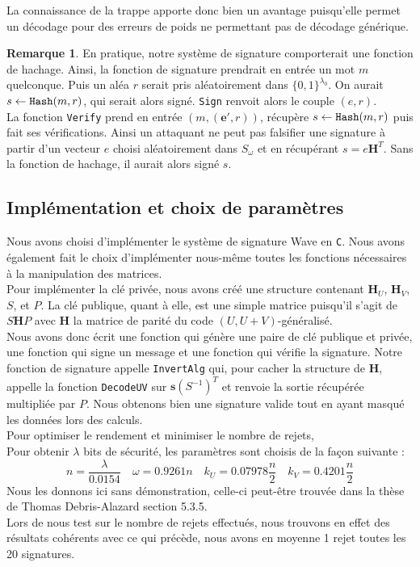 \documentclass[12pt]{article}
\theoremstyle{plain}
\theoremstyle{definition}
\newtheorem{remarque}[thm]{Remarque}
\newcommand{\e}{\mathbf{e}}
\newcommand{\s}{\mathbf{s}}
\begin{document}
\noindent La connaissance de la trappe apporte donc bien un avantage puisqu'elle permet un décodage pour des erreurs de poids ne permettant pas de décodage générique. 

\begin{remarque} En pratique, notre système de signature comporterait une fonction de hachage. Ainsi, la fonction de signature prendrait en entrée un mot $m$ quelconque. Puis un aléa $r$ serait pris aléatoirement dans $\{0,1\}^{\lambda_0}$. On aurait $s \leftarrow \verb|Hash| (m,r)$, qui serait alors signé. \verb|Sign| renvoit alors le couple $(e,r)$. \\
La fonction \verb|Verify| prend en entrée $(m,(\e',r))$, récupère $s \leftarrow \verb|Hash| (m,r)$ puis fait ses vérifications. Ainsi un attaquant ne peut pas falsifier une signature à partir d'un vecteur $e$ choisi aléatoirement dans $S_{\omega}$ et en récupérant $s = e\mathbf{H}^T$. Sans la fonction de hachage, il aurait alors signé $s$.
\end{remarque}

\subsection{Implémentation et choix de paramètres}

Nous avons choisi d'implémenter le système de signature Wave en \verb|C|. 
Nous avons également fait le choix d'implémenter nous-même toutes les fonctions nécessaires à la manipulation des matrices. \\
Pour implémenter la clé privée, nous avons créé une structure contenant $\mathbf{H}_U$, $\mathbf{H}_V$, $S$, et $P$. La clé publique, quant à elle, est une simple matrice puisqu'il s'agit de $S\mathbf{H}P$ avec $\mathbf{H}$ la matrice de parité du code $(U,U+V)$-généralisé.\\
Nous avons donc écrit une fonction qui génère une paire de clé publique et privée, une fonction qui signe un message et une fonction qui vérifie la signature.
Notre fonction de signature appelle \verb|InvertAlg| qui, pour cacher la structure de $\mathbf{H}$, appelle la fonction \verb|DecodeUV| sur $\s(S^{-1})^T$ et renvoie la sortie récupérée multipliée par $P$. Nous obtenons bien une signature valide tout en ayant masqué les données lors des calculs.\\
Pour optimiser le rendement et minimiser le nombre de rejets,\\
Pour obtenir $\lambda$ bits de sécurité, les paramètres sont choisis de la façon suivante :
$$ n = \frac{\lambda}{0.0154} \quad \omega = 0.9261n \quad k_U = 0.07978\frac{n}{2} \quad k_V = 0.4201\frac{n}{2}$$
Nous les donnons ici sans démonstration, celle-ci peut-être trouvée dans la thèse de Thomas Debris-Alazard section 5.3.5.\\
Lors de nous test sur le nombre de rejets effectués, nous trouvons en effet des résultats cohérents avec ce qui précède, nous avons en moyenne 1 rejet toutes les 20 signatures.\\
\end{document}

